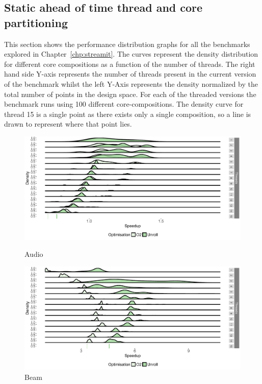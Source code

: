 \begin{appendices}
\chapter{Static ahead of time thread and core partitioning}
This section shows the performance distribution graphs for all the benchmarks explored in Chapter~\ref{chp:streamit}.
The curves represent the density distribution for different core compositions as a function of the number of threads.
The right hand side Y-axis represents the number of threads present in the current version of the benchmark whilst the left Y-Axis represents the density normalized by the total number of points in the design space.
For each of the threaded versions the benchmark runs using 100 different core-compositions.
The density curve for thread 15 is a single point as there exists only a single composition, so a line is drawn to represent where that point lies.
\begin{figure}[t]
\center
 \includegraphics[width=1\textwidth]{streamit-paper/graphics/appendixgraphs/audio_total2.pdf}
\caption{Audio}\label{chp:stream:at}

\includegraphics[width=1\textwidth]{streamit-paper/graphics/appendixgraphs/beamformer_total2.pdf}
\caption{Beam}\label{chp:stream:bt}


\end{figure}
\end{appendices}
